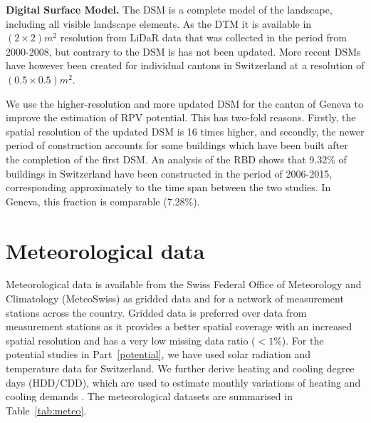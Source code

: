 \textbf{Digital Surface Model.} The DSM is a complete model of the landscape, including all visible landscape elements. As the DTM it is available  in $(2\times2)m^2$ resolution from LiDaR data that was collected in the period from 2000-2008, but contrary to the DSM is has not been updated. More recent DSMs have however been created for individual cantons in Switzerland at a resolution of $(0.5\times0.5)m^2$. 

We use the higher-resolution and more updated DSM for the canton of Geneva to improve the estimation of RPV potential.
This has two-fold reasons. Firstly, the spatial resolution of the updated DSM is 16 times higher, and secondly, the newer period of construction accounts for some buildings which have been built after the completion of the first DSM.
An analysis of the RBD shows that 9.32\% of buildings in Switzerland have been constructed in the period of 2006-2015, corresponding approximately to the time span between the two studies. In Geneva, this fraction is comparable (7.28\%).


\section{Meteorological data}
\label{data_meteo}
Meteorological data is available from the Swiss Federal Office of Meteorology and Climatology (MeteoSwiss) as gridded data and for a network of measurement stations across the country. 
Gridded data is preferred over data from measurement stations as it provides a better spatial coverage with an increased spatial resolution and has a very low missing data ratio ($<1\%$). 
For the potential studies in Part~\ref{potential}, we have used solar radiation and temperature data for Switzerland. We further derive heating and cooling degree days (HDD/CDD), which are used to estimate monthly variations of heating and cooling demands \cite{stadler_contribution_2018}. The meteorological datasets are summarised in Table~\ref{tab:meteo}.

